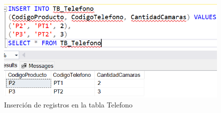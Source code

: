 \begin{figure}[H]
  \centering
  \includegraphics[scale = 0.5]{Imagenes/sql/3.insertar_registros/insertar_registros_telefono.png}
  \caption{Inserción de registros en la tabla Telefono}
\end{figure}